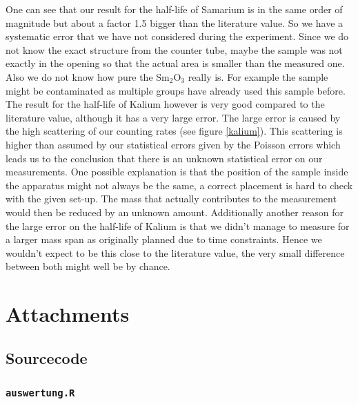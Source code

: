\documentclass[12pt]{article}
\newcommand{\code}[1]{\texttt{#1}}
\begin{document}
One can see that our result for the half-life of Samarium is in the same order of magnitude but about a factor 1.5 bigger than the literature value. So we have a systematic error that we have not considered during the experiment. Since we do not know the exact structure from the counter tube, maybe the sample was not exactly in the opening so that the actual area is smaller than the measured one.\\
Also we do not know how pure the Sm$_2$O$_3$ really is. For example the sample might be contaminated as multiple groups have already used this sample before.\\

The result for the half-life of Kalium however is very good compared to the literature value, although it has a very large error. The large error is caused by the high scattering of our counting rates (see figure \ref{kalium}). This scattering is higher than assumed by our statistical errors given by the Poisson errors which leads us to the conclusion that there is an unknown statistical error on our measurements. One possible explanation is that the position of the sample inside the apparatus might not always be the same, a correct placement is hard to check with the given set-up. The mass that actually contributes to the measurement would then be reduced by an unknown amount. 
Additionally another reason for the large error on the half-life of Kalium is that we didn't manage to measure for a larger mass span as originally planned due to time constraints. Hence we wouldn't expect to be this close to the literature value, the very small difference between both might well be by chance.

\newpage
\section{Attachments}









\subsection{Sourcecode}

\subsubsection{\code{auswertung.R}}\label{auswertung.R}

\end{document}
